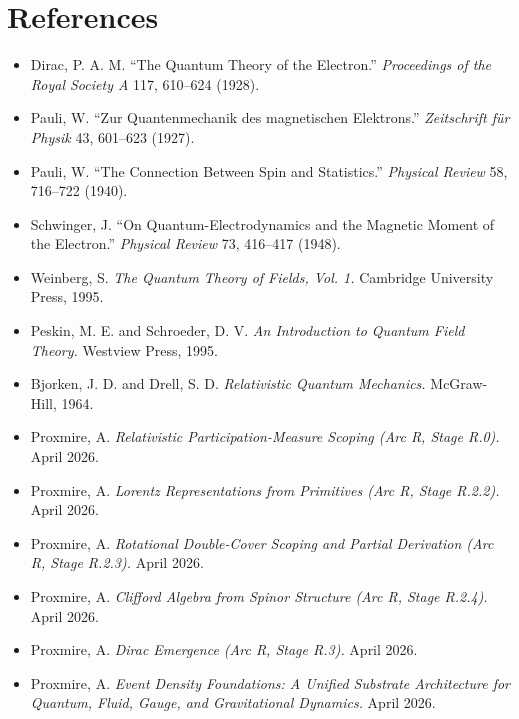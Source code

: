\documentclass[11pt,a4paper]{article}
\begin{document}
\section*{References}

\begin{itemize}[leftmargin=*,itemsep=2pt]
  \item Dirac, P. A. M. ``The Quantum Theory of the Electron.'' \emph{Proceedings of the Royal Society A} 117, 610--624 (1928).
  \item Pauli, W. ``Zur Quantenmechanik des magnetischen Elektrons.'' \emph{Zeitschrift f\"ur Physik} 43, 601--623 (1927).
  \item Pauli, W. ``The Connection Between Spin and Statistics.'' \emph{Physical Review} 58, 716--722 (1940).
  \item Schwinger, J. ``On Quantum-Electrodynamics and the Magnetic Moment of the Electron.'' \emph{Physical Review} 73, 416--417 (1948).
  \item Weinberg, S. \emph{The Quantum Theory of Fields, Vol. 1.} Cambridge University Press, 1995.
  \item Peskin, M. E. and Schroeder, D. V. \emph{An Introduction to Quantum Field Theory.} Westview Press, 1995.
  \item Bjorken, J. D. and Drell, S. D. \emph{Relativistic Quantum Mechanics.} McGraw-Hill, 1964.
  \item Proxmire, A. \emph{Relativistic Participation-Measure Scoping (Arc R, Stage R.0).} April 2026.
  \item Proxmire, A. \emph{Lorentz Representations from Primitives (Arc R, Stage R.2.2).} April 2026.
  \item Proxmire, A. \emph{Rotational Double-Cover Scoping and Partial Derivation (Arc R, Stage R.2.3).} April 2026.
  \item Proxmire, A. \emph{Clifford Algebra from Spinor Structure (Arc R, Stage R.2.4).} April 2026.
  \item Proxmire, A. \emph{Dirac Emergence (Arc R, Stage R.3).} April 2026.
  \item Proxmire, A. \emph{Event Density Foundations: A Unified Substrate Architecture for Quantum, Fluid, Gauge, and Gravitational Dynamics.} April 2026.
\end{itemize}
\end{document}
